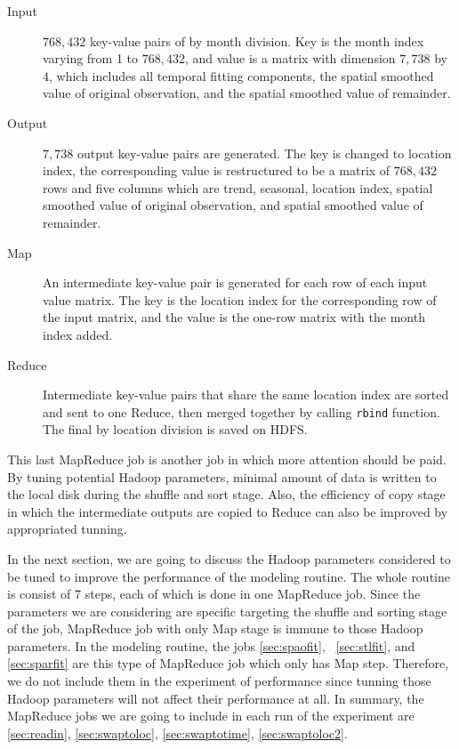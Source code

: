 \begin{description}
\item[Input] $768,432$ key-value pairs of by month division. Key is the month 
index varying from 1 to $768,432$, and value is a matrix with dimension $7,738$ 
by $4$, which includes all temporal fitting components, the spatial smoothed value
of original observation, and the spatial smoothed value of remainder.
\item[Output] $7,738$ output key-value pairs are generated. The key is changed
to location index, the corresponding value is restructured to be a matrix of 
$768,432$ rows and five columns which are trend, seasonal, location index, spatial 
smoothed value of original observation, and spatial smoothed value of remainder. 
\item[Map] An intermediate key-value pair is generated for each row of each input
value matrix. The key is the location index for the corresponding row of the 
input matrix, and the value is the one-row matrix with the month index added.
\item[Reduce] Intermediate key-value pairs that share the same location index are 
sorted and sent to one Reduce, then merged together by calling \texttt{rbind}
function. The final by location division is saved on HDFS.
\end{description}

This last MapReduce job is another job in which more attention should be paid.
By tuning potential Hadoop parameters, minimal amount of data is written to the
local disk during the shuffle and sort stage. Also, the efficiency of copy stage 
in which the intermediate outputs are copied to Reduce can also be improved by
appropriated tunning.

In the next section, we are going to discuss the Hadoop parameters considered to
be tuned to improve the performance of the modeling routine. The whole routine is
consist of 7 steps, each of which is done in one MapReduce job. Since the parameters
we are considering are specific targeting the shuffle and sorting stage of the
job, MapReduce job with only Map stage is immune to those Hadoop parameters.
In the modeling routine, the jobs \ref{sec:spaofit}, ~\ref{sec:stlfit}, and 
\ref{sec:sparfit} are this type of MapReduce job which only has Map step. 
Therefore, we do not include them in the experiment of performance since tunning
those Hadoop parameters will not affect their performance at all. In summary, 
the MapReduce jobs we are going to include in each run of the experiment are
\ref{sec:readin}, \ref{sec:swaptoloc}, \ref{sec:swaptotime}, \ref{sec:swaptoloc2}.


